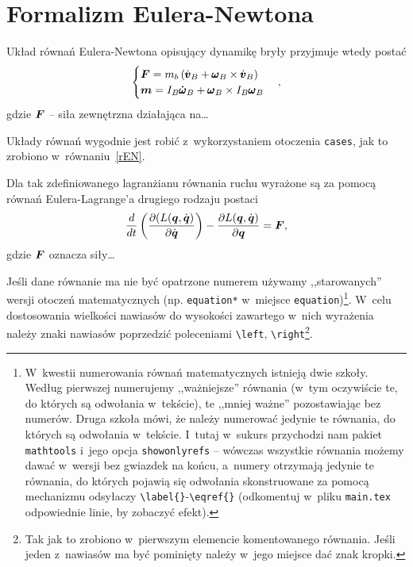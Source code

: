 \section{Formalizm Eulera-Newtona} \label{sec:newton}
\noindent
[\ldots] Układ równań Eulera-Newtona opisujący dynamikę bryły przyjmuje wtedy postać
\begin{equation}
  \label{rEN}
  \begin{cases}
    \boldsymbol{F} = m_b \left(\dot{\pmb{v}}_B + \pmb{\omega}_B\times\dot{\pmb{v}}_B \right)\\
    \boldsymbol{m} = I_B\pmb{\dot{\omega}}_B + \pmb{\omega}_B\times I_B\pmb{\omega}_B
  \end{cases},
\end{equation}
gdzie $\boldsymbol{F}$ -- siła zewnętrzna działająca na\ldots

{\red
  Układy równań wygodnie jest robić z~wykorzystaniem otoczenia \texttt{cases}, jak to zrobiono w~równaniu~\eqref{rEN}.}

\noindent
[\ldots]

\noindent
Dla tak zdefiniowanego lagranżianu równania ruchu wyrażone są za pomocą równań Eulera-Lagrange'a drugiego rodzaju postaci
\begin{equation*}
  \frac{d}{dt}\left( \frac{\partial(L(\boldsymbol{q},\dot{\boldsymbol{q}})}{\partial\dot{\boldsymbol{q}}}\right) - \frac{\partial L(\boldsymbol{q},\dot{\boldsymbol{q}})}{\partial \boldsymbol{q}} = \boldsymbol{F},
\end{equation*}
gdzie $\boldsymbol{F}$ oznacza siły\ldots

{\red
  Jeśli dane równanie ma nie być opatrzone numerem używamy ,,starowanych'' wersji otoczeń matematycznych (np. \texttt{equation*} w~miejsce \texttt{equation})\footnote{\label{stopka_numery}\red W~kwestii numerowania równań matematycznych istnieją dwie szkoły. Według pierwszej numerujemy ,,ważniejsze'' równania (w~tym oczywiście te, do których są odwołania w~tekście), te ,,mniej ważne'' pozostawiając bez numerów. Druga szkoła mówi, że należy numerować jedynie te równania, do których są odwołania w~tekście. I~tutaj w~sukurs przychodzi nam pakiet \texttt{mathtools} i~jego opcja \texttt{showonlyrefs} -- wówczas wszystkie równania możemy dawać w~wersji bez gwiazdek na końcu, a~numery otrzymają jedynie te równania, do których pojawią się odwołania skonstruowane za pomocą mechanizmu odsyłaczy \texttt{\textbackslash label\{\}}-\texttt{\textbackslash eqref\{\}} (odkomentuj w~pliku \texttt{main.tex} odpowiednie linie, by zobaczyć efekt).}. W~celu dostosowania wielkości nawiasów do wysokości zawartego w~nich wyrażenia należy znaki nawiasów poprzedzić poleceniami \texttt{\textbackslash left}, \texttt{\textbackslash right}\footnote{\red Tak jak to zrobiono w~pierwszym elemencie komentowanego równania. Jeśli jeden z~nawiasów ma być pominięty należy w~jego miejsce dać znak kropki.}. }

\noindent
[\ldots]

